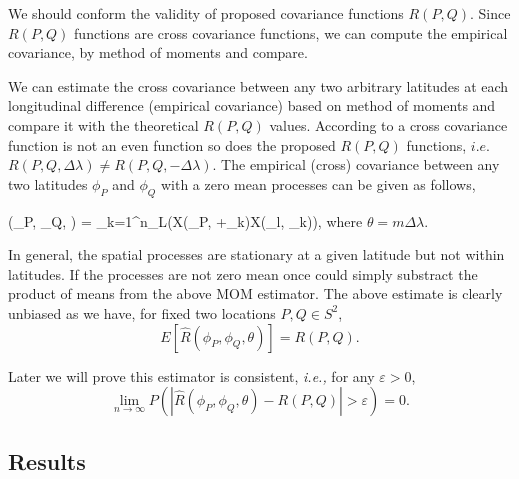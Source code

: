 	
	We should conform the validity of proposed covariance functions $R(P,Q)$. Since $R(P,Q)$ functions are cross covariance functions, we can compute the empirical covariance, by method of moments and compare.
	
	We can estimate the cross covariance between any two arbitrary latitudes at each longitudinal difference (empirical covariance) based on method of moments and compare it with the theoretical $R(P,Q)$ values. According to \cite{Wackernagel2013} a cross covariance function is not an even function so does the proposed $R(P,Q)$ functions, $i.e.$ $R(P,Q, \Delta\lambda) \ne R(P,Q,-\Delta\lambda)$. The empirical (cross) covariance between any two latitudes $\phi_P$ and $\phi_Q$ with a zero mean processes can be given as follows,
	
	\beq \label{emprical_var}
	(\phi_P, \phi_Q, \theta) = \sum_{k=1}^{n_L}(X(\phi_P, \theta+\lambda_k)\cdot X(\phi_l, \lambda_k)),
	\eeq
	where $\theta = m\Delta\lambda$.
	
	In general, the spatial processes are stationary at a given latitude but not within latitudes. If the processes are not zero mean once could simply substract the product of means from the above MOM estimator. The above estimate is clearly unbiased as we have, for fixed two locations $P, Q \in S^2$,
	\[
		E[\hat{R}(\phi_P, \phi_Q, \theta)] = R(P,Q).
	\]
	
	Later we will prove this estimator is consistent, {\em i.e.,} for any $\varepsilon > 0$,
	\[
		\lim_{n \to \infty} P(|\hat{R}(\phi_P, \phi_Q, \theta) - R(P,Q)| > \varepsilon) = 0.
	\]
	
	
	\subsection{Results}
	
	
